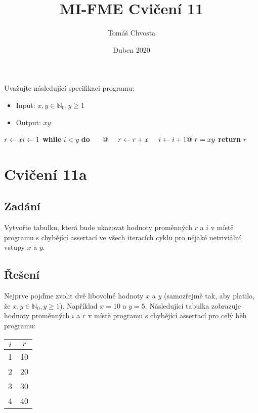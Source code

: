 \documentclass{article}
\title{MI-FME Cvičení 11}
\author{Tomáš Chvosta}
\date{Duben 2020}
\newcommand\tab[1][0.5cm]{\hspace*{#1}}
\newcommand{\N}{\mathbb{N}}
\begin{document}
\maketitle

Uvažujte následující specifikaci programu:

\begin{itemize}
    \item Input: $x, y \in \N_0, y \geq 1$
    \item Output: $xy$
\end{itemize}
$r \leftarrow x \newline i \leftarrow 1 \newline$ \textbf{while} $i < y$ \textbf{do} $\newline \tab @ \newline \tab r \leftarrow r + x \newline \tab i \leftarrow i + 1 \newline @\ r = xy \newline$ \textbf{return} $r$ 

\section{Cvičení 11a}

\subsection{Zadání}
Vytvořte tabulku, která bude ukazovat hodnoty proměnných $r$ a $i$ v místě programu s chybějící assertací ve všech iteracích cyklu pro nějaké netriviální vstupy $x$ a $y$.

\subsection{Řešení}
Nejprve pojďme zvolit dvě libovolné hodnoty $x$ a $y$ (samozřejmě tak, aby platilo, že $x, y \in \N_0, y \geq 1$). Například $x = 10$ a $y = 5$. Následující tabulka zobrazuje hodnoty proměnných $i$ a $r$ v místě programu s chybějící assertací pro celý běh programu:
\begin{table}[H]\centering
    \begin{tabular}{||c|c||}
            \hline $i$ & $r$  \\ \hline \hline
    	    1 & 10 \\  \hline
    	    2 & 20 \\  \hline
    	    3 & 30 \\  \hline
    	    4 & 40 \\  \hline
    \end{tabular}
\end{table}
\end{document}
